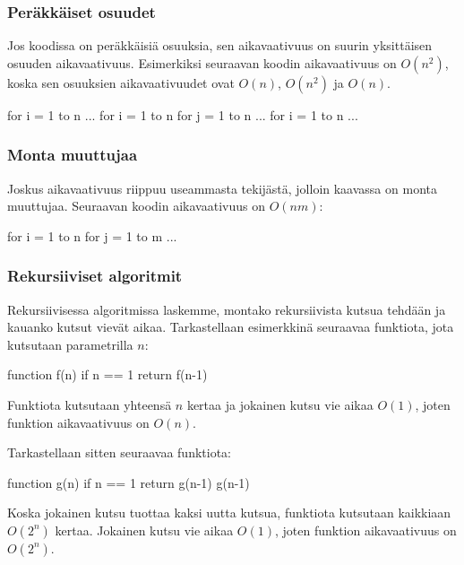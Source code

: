 \subsubsection{Peräkkäiset osuudet}

Jos koodissa on peräkkäisiä osuuksia, sen aikavaativuus on suurin
yksittäisen osuuden aikavaativuus. Esimerkiksi seuraavan koodin aikavaativuus on $O(n^2)$,
koska sen osuuksien aikavaativuudet ovat $O(n)$, $O(n^2)$ ja $O(n)$.

\begin{code}
for i = 1 to n
    ...
for i = 1 to n
    for j = 1 to n
        ...
for i = 1 to n
    ...
\end{code}

\subsubsection{Monta muuttujaa}

Joskus aikavaativuus riippuu useammasta tekijästä,
jolloin kaavassa on monta muuttujaa.
Seuraavan koodin aikavaativuus on $O(nm)$:

\begin{code}
for i = 1 to n
    for j = 1 to m
        ...
\end{code}

\subsubsection{Rekursiiviset algoritmit}

Rekursiivisessa algoritmissa laskemme,
montako rekursiivista kutsua teh\-dään ja kauanko
kutsut vievät aikaa.
Tarkastellaan esimerkkinä seuraavaa
funktiota, jota kutsutaan parametrilla $n$:

\begin{code}
function f(n)
    if n == 1
        return
    f(n-1)
\end{code}

Funktiota kutsutaan yhteensä $n$ kertaa ja jokainen
kutsu vie aikaa $O(1)$, joten funktion aikavaativuus on $O(n)$.

Tarkastellaan sitten seuraavaa funktiota:

\begin{code}
function g(n)
    if n == 1
        return
    g(n-1)
    g(n-1)
\end{code}

Koska jokainen kutsu tuottaa kaksi uutta kutsua,
funktiota kutsutaan kaikkiaan $O(2^n)$ kertaa.
Jokainen kutsu vie aikaa $O(1)$,
joten funktion aikavaativuus on $O(2^n)$.

